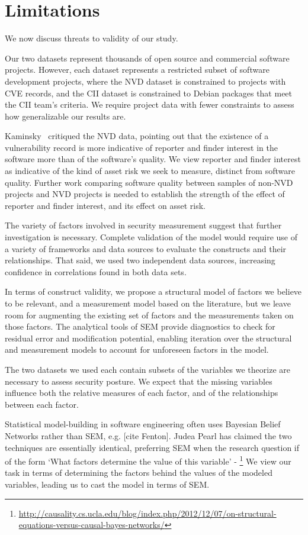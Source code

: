 \section{Limitations}
\label{sec:limitations}

We now discuss threats to validity of our study.

Our two datasets represent thousands of open source and commercial software projects. However, each dataset represents a restricted subset of software development projects, where the NVD dataset is constrained to projects with CVE records, and the CII dataset is constrained to Debian packages that meet the CII team's criteria. We require project data with fewer constraints to assess how generalizable our results are.    

Kaminsky~\cite{kaminsky2011showing} critiqued the NVD data, pointing out that the existence of a vulnerability record is more indicative of reporter and finder interest in the software more than of the software's quality. We view reporter and finder interest as indicative of the kind of asset risk we seek to measure, distinct from software quality. Further work comparing software quality between samples of non-NVD projects and NVD projects is needed to establish the strength of the effect of reporter and finder interest, and its effect on asset risk.

The variety of factors involved in security measurement suggest that further investigation is necessary. Complete validation of the model would require use of a variety of frameworks and data sources to evaluate the constructs and their relationships. That said, we used two independent data sources, increasing confidence in correlations found in both data sets. 

In terms of construct validity, we propose a structural model of factors we believe to be relevant, and a measurement model based on the literature, but we leave room for augmenting the existing set of factors and the measurements taken on those factors. The analytical tools of SEM provide diagnostics to check for residual error and modification potential, enabling iteration over the structural and measurement models to account for unforeseen factors in the model. 
  
The two datasets we used each contain subsets of the variables we theorize are necessary to assess security posture. We expect that the missing variables influence both the relative measures of each factor, and of the relationships between each factor. 

Statistical model-building in software engineering often uses Bayesian Belief Networks rather than SEM, e.g. [cite Fenton]. Judea Pearl has claimed the two techniques are essentially identical, preferring SEM when the research question if of the form `What factors determine the value of this variable' - \footnote{\url{http://causality.cs.ucla.edu/blog/index.php/2012/12/07/on-structural-equations-versus-causal-bayes-networks/}} We view our task in terms of determining the factors behind the values of the modeled variables, leading us to cast the model in terms of SEM.
